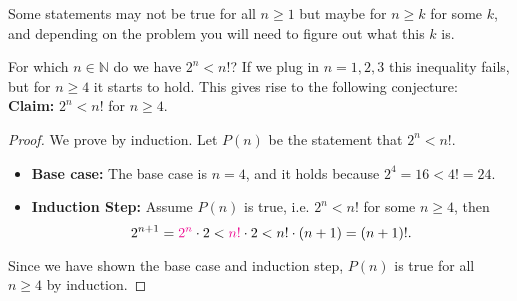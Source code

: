 \documentclass[11pt,dvipsnames]{book}
\numberwithin{equation}{section} %
\numberwithin{figure}{section} %
\numberwithin{table}{section} %
\begin{document}
Some statements may not be true for all $n\geq 1$ but maybe for $n\geq k$ for some $k$, and depending on the problem you will need to figure out what this $k$ is. 


%

%


\begin{example}
For which $n\in\mathbb{N}$ do we have $2^{n}<n!$? If we plug in $n=1,2,3$ this inequality fails, but for $n\geq 4$ it starts to hold. This gives rise to the following conjecture:\\

{\bf Claim:} $2^{n}<n!$ for $n\geq 4$. 

\begin{proof}
We prove by induction.  Let $P(n)$ be the statement that $2^{n}<n!$.

\begin{itemize}
\item {\bf Base case:} The base case is $n=4$, and it holds because $2^{4} = 16 < 4!=24$. \\

\item {\bf Induction Step:} Assume $P(n)$ is true, i.e. {\color{magenta} $2^{n}<n!$} for some $n\geq 4$, then
\[
2^{n+1} = {\color{magenta} 2^{n}}\cdot 2 < {\color{magenta}n!}\cdot 2 < n! \cdot (n+1)=(n+1)!.
\]
\end{itemize}
Since we have shown the base case and induction step, $P(n)$ is true for all $n\geq 4$ by induction.
\end{proof}
\end{example}
\end{document}
